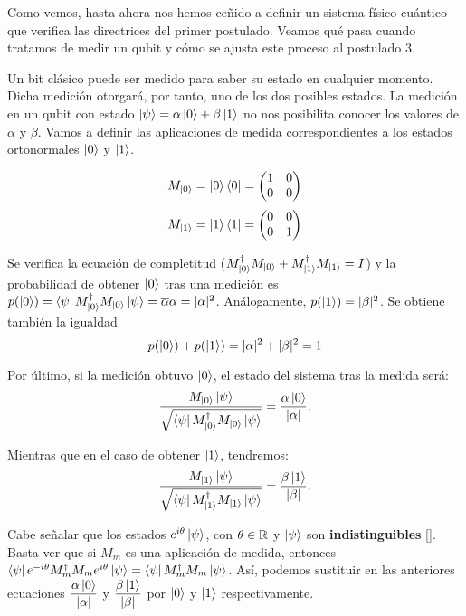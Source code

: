 Como vemos, hasta ahora nos hemos ceñido a definir un sistema físico cuántico que verifica las directrices del primer postulado. Veamos qué pasa cuando tratamos de medir un qubit y cómo se ajusta este proceso al postulado 3.

Un bit clásico puede ser medido para saber su estado en cualquier momento. Dicha medición otorgará, por tanto, uno de los dos posibles estados. La medición en un qubit con estado $\left|\psi\right\rangle=\alpha\left|0\right\rangle+\beta\left|1\right\rangle$ no nos posibilita conocer los valores de $\alpha$ y $\beta$. Vamos a definir las aplicaciones de medida correspondientes a los estados ortonormales $\left|0\right\rangle$ y $\left|1\right\rangle$.

\begin{equation}
M_{\left|0\right\rangle}=\left|0\right\rangle\left\langle0\right|=\left(\begin{matrix}1&0\\0&0\end{matrix}\right)
\end{equation}
\begin{equation}
M_{\left|1\right\rangle}=\left|1\right\rangle\left\langle1\right|=\left(\begin{matrix}0&0\\0&1\end{matrix}\right)
\end{equation}

Se verifica la ecuación de completitud ($M_{\left|0\right\rangle}^\dag M_{\left|0\right\rangle} + M_{\left|1\right\rangle}^\dag M_{\left|1\right\rangle}=I$) y la probabilidad de obtener $\left|0\right\rangle$ tras una medición es $p(\left|0\right\rangle)=\left\langle\psi\right|M_{\left|0\right\rangle}^\dag M_{\left|0\right\rangle}\left|\psi\right\rangle=\overline{\alpha}\alpha = |\alpha|^2$. Análogamente, $p(\left|1\right\rangle)=|\beta|^2$. Se obtiene también la igualdad
\[p(\left|0\right\rangle)+p(\left|1\right\rangle)=|\alpha|^2+|\beta|^2=1\]

Por último, si la medición obtuvo $\left|0\right\rangle$, el estado del sistema tras la medida será:
\begin{equation}
\dfrac{M_{\left|0\right\rangle}\left|\psi\right\rangle}{\sqrt{\left\langle\psi\right|M_{\left|0\right\rangle}^\dag M_{\left|0\right\rangle}\left|\psi\right\rangle}}=\dfrac{\alpha\left|0\right\rangle}{|\alpha|}.
\end{equation}

Mientras que en el caso de obtener $\left|1\right\rangle$, tendremos:
\begin{equation}
\dfrac{M_{\left|1\right\rangle}\left|\psi\right\rangle}{\sqrt{\left\langle\psi\right|M_{\left|1\right\rangle}^\dag M_{\left|1\right\rangle}\left|\psi\right\rangle}}=\dfrac{\beta\left|1\right\rangle}{|\beta|}.
\end{equation}

Cabe señalar que los estados $e^{i\theta}\left|\psi\right\rangle$, con $\theta\in\mathbb{R}$ y $\left|\psi\right\rangle$ son \textbf{indistinguibles} [\cite[p.~93]{nielsen2001quantum}]. Basta ver que si $M_m$ es una aplicación de medida, entonces $\left\langle\psi\right|e^{-i\theta}M_m^\dag M_m e^{i\theta}\left|\psi\right\rangle=\left\langle\psi\right|M_m^\dag M_m\left|\psi\right\rangle$. Así, podemos sustituir en las anteriores ecuaciones $\dfrac{\alpha\left|0\right\rangle}{|\alpha|}$ y $\dfrac{\beta\left|1\right\rangle}{|\beta|}$ por $\left|0\right\rangle$ y $\left|1\right\rangle$ respectivamente.

